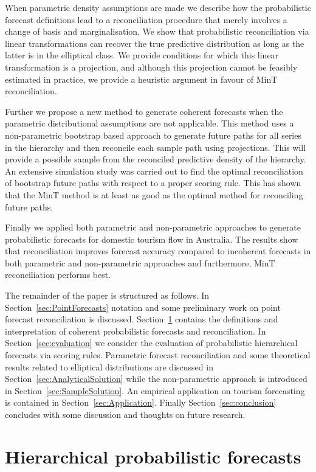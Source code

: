 \documentclass[12pt]{article}
\theoremstyle{definition}
\begin{document}
When parametric density assumptions are made we describe how the probabilistic forecast definitions lead to a reconciliation procedure that merely involves a change of basis and marginalisation. We show that probabilistic reconciliation via linear transformations can recover the true predictive distribution as long as the latter is in the elliptical class. We provide conditions for which this linear transformation is a projection, and although this projection cannot be feasibly estimated in practice, we provide a heuristic argument in favour of MinT reconciliation.

Further we propose a new method to generate coherent forecasts when the parametric distributional assumptions are not applicable. This method uses a non-parametric bootstrap based approach to generate future paths for all series in the hierarchy and then reconcile each sample path using projections. This will provide a possible sample from the reconciled predictive density of the hierarchy. An extensive simulation study was carried out to find the optimal reconciliation of bootstrap future paths with respect to a proper scoring rule. This has shown that the MinT method is at least as good as the optimal method for reconciling future paths.

Finally we applied both parametric and non-parametric approaches to generate probabilistic forecasts for domestic tourism flow in Australia. The results show that reconciliation improves forecast accuracy compared to incoherent forecasts in both parametric and non-parametric approaches and furthermore, MinT reconciliation performs best.

The remainder of the paper is structured as follows. In Section~\ref{sec:PointForecasts} notation and some preliminary work on point forecast reconciliation is discussed. Section~\ref{sec:ProbForecasts} contains the definitions and interpretation of coherent probabilistic forecasts and reconciliation. In Section~\ref{sec:evaluation} we consider the evaluation of probabilistic hierarchical forecasts via scoring rules. Parametric forecast reconciliation and some theoretical results related to elliptical distributions are discussed in Section~\ref{sec:AnalyticalSolution} while the non-parametric approach is introduced in Section~\ref{sec:SampleSolution}. An empirical application on tourism forecasting is contained in Section~\ref{sec:Application}. Finally Section~\ref{sec:conclusion} concludes with some discussion and thoughts on future research.

\section{Hierarchical probabilistic forecasts}\label{sec:ProbForecasts}
\end{document}
